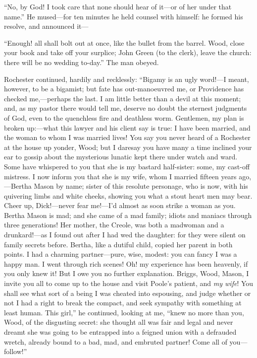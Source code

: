\enquote{No, by God! I took care that none should hear of it---or of
her under that name.} He mused---for ten minutes he held counsel with
himself: he formed his resolve, and announced it---

\enquote{Enough! all shall bolt out at once, like the bullet from the
barrel. Wood, close your book and take off your surplice; John Green
(to the clerk), leave the church: there will be no wedding to-day.} The
man obeyed.

\Mr{} Rochester continued, hardily and recklessly: \enquote{Bigamy is an ugly
word!---I meant, however, to be a bigamist; but fate has out-manoeuvred
me, or Providence has checked me,---perhaps the last. I am little
better than a devil at this moment; and, as my pastor there would tell
me, deserve no doubt the sternest judgments of God, even to the
quenchless fire and deathless worm. Gentlemen, my plan is broken
up:---what this lawyer and his client say is true: I have been married,
and the woman to whom I was married lives! You say you never heard of a
\Mrs{} Rochester at the house up yonder, Wood; but I daresay you have many
a time inclined your ear to gossip about the mysterious lunatic kept
there under watch and ward. Some have whispered to you that she is my
bastard half-sister: some, my cast-off mistress. I now inform you that
she is my wife, whom I married fifteen years ago,---Bertha Mason by
name; sister of this resolute personage, who is now, with his quivering
limbs and white cheeks, showing you what a stout heart men may bear. 
Cheer up, Dick!---never fear me!---I'd almost as soon strike a woman as
you. Bertha Mason is mad; and she came of a mad family; idiots and
maniacs through three generations! Her mother, the Creole, was both a
madwoman and a drunkard!---as I found out after I had wed the daughter:
for they were silent on family secrets before. Bertha, like a dutiful
child, copied her parent in both points. I had a charming
partner---pure, wise, modest: you can fancy I was a happy man. I went
through rich scenes! Oh! my experience has been heavenly, if you only
knew it! But I owe you no further explanation. Briggs, Wood, Mason, I
invite you all to come up to the house and visit \Mrs{} Poole's patient,
and \emph{my wife}! You shall see what sort of a being I was cheated
into espousing, and judge whether or not I had a right to break the
compact, and seek sympathy with something at least human. This girl,}
he continued, looking at me, \enquote{knew no more than you, Wood, of
the disgusting secret: she thought all was fair and legal and never
dreamt she was going to be entrapped into a feigned union with a
defrauded wretch, already bound to a bad, mad, and embruted partner! 
Come all of you---follow!}

